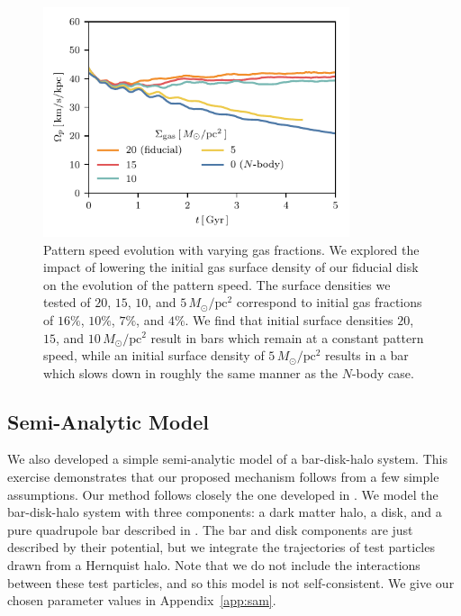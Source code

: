 \documentclass[twocolumn,linenumbers]{aastex631}
\newcommand{\Nbody}{$N$-body}
\newcommand{\Msun}{\ensuremath{M_{\odot}}}
\begin{document}
\begin{figure}
    \centering
    \includegraphics[width=9cm]{fig/ps_fgas.pdf}
    \caption{Pattern speed evolution with varying gas fractions. We explored the
    impact of lowering the initial gas surface density of our fiducial disk on
    the evolution of the pattern speed. The surface densities we tested of $20$,
    $15$, $10$, and $5\,\Msun/\textrm{pc}^2$ correspond to initial gas
    fractions of $16\%$, $10\%$, $7\%$, and $4\%$. We find that initial surface
    densities $20$, $15$, and $10\,\Msun/\textrm{pc}^2$ result in bars which
    remain at a constant pattern speed, while an initial surface density of
    $5\,\Msun/\textrm{pc}^2$ results in a bar which slows down in roughly the
    same manner as the \Nbody{} case.}
    \label{fig:fgas}
\end{figure}

\subsection{Semi-Analytic Model}
We also developed a simple semi-analytic model of a bar-disk-halo system. This
exercise demonstrates that our proposed mechanism follows from a few simple
assumptions. Our method follows closely the one developed in
\citet{2022MNRAS.513..768C}. We model the bar-disk-halo system with three
components: a dark matter \citet{1990ApJ...356..359H} halo, a
\citet{1975PASJ...27..533M} disk, and a pure quadrupole bar
described in \citet{2022MNRAS.513..768C}. The bar and disk components are just
described by their potential, but we integrate the trajectories of test
particles drawn from a Hernquist halo. Note that we do not include the
interactions between these test particles, and so this model is not
self-consistent. We give our chosen parameter values in Appendix~\ref{app:sam}.
\end{document}
